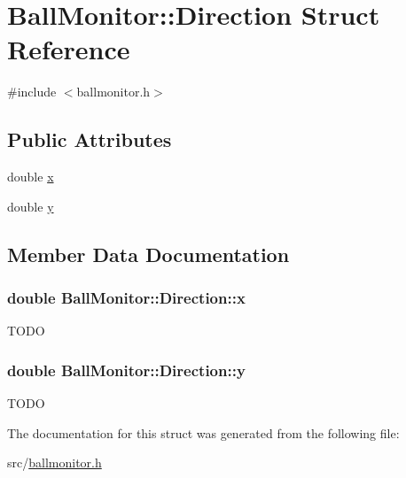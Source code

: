 \hypertarget{structBallMonitor_1_1Direction}{
\section{BallMonitor::Direction Struct Reference}
\label{structBallMonitor_1_1Direction}
}


{\ttfamily \#include $<$ballmonitor.h$>$}

\subsection*{Public Attributes}
\begin{DoxyCompactItemize}
\item 
double \hyperlink{structBallMonitor_1_1Direction_aa0bde9b600685b464f05bf098857e4ce}{x}
\item 
double \hyperlink{structBallMonitor_1_1Direction_a1228146c1a63d672e59b1e5df760bf68}{y}
\end{DoxyCompactItemize}


\subsection{Member Data Documentation}
\hypertarget{structBallMonitor_1_1Direction_aa0bde9b600685b464f05bf098857e4ce}{
\subsubsection[{x}]{\setlength{\rightskip}{0pt plus 5cm}double {\bf BallMonitor::Direction::x}}}
\label{structBallMonitor_1_1Direction_aa0bde9b600685b464f05bf098857e4ce}
TODO \hypertarget{structBallMonitor_1_1Direction_a1228146c1a63d672e59b1e5df760bf68}{
\subsubsection[{y}]{\setlength{\rightskip}{0pt plus 5cm}double {\bf BallMonitor::Direction::y}}}
\label{structBallMonitor_1_1Direction_a1228146c1a63d672e59b1e5df760bf68}
TODO 

The documentation for this struct was generated from the following file:\begin{DoxyCompactItemize}
\item 
src/\hyperlink{ballmonitor_8h}{ballmonitor.h}\end{DoxyCompactItemize}
